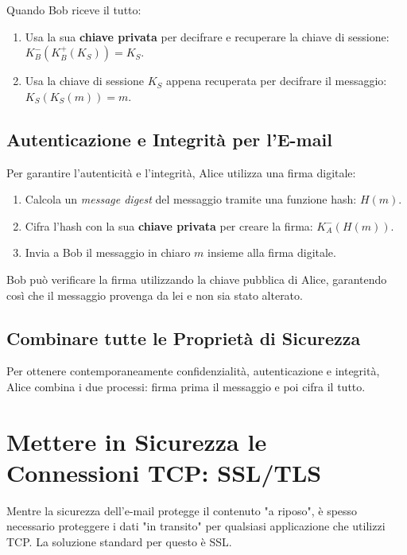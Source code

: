 Quando Bob riceve il tutto:
\begin{enumerate}
    \item Usa la sua \textbf{chiave privata} per decifrare e recuperare la chiave di sessione: $K_B^-(K_B^+(K_S)) = K_S$.
    \item Usa la chiave di sessione $K_S$ appena recuperata per decifrare il messaggio: $K_S(K_S(m)) = m$.
\end{enumerate}

\subsection{Autenticazione e Integrità per l'E-mail}
Per garantire l'autenticità e l'integrità, Alice utilizza una firma digitale:
\begin{enumerate}
    \item Calcola un \textit{message digest} del messaggio tramite una funzione hash: $H(m)$.
    \item Cifra l'hash con la sua \textbf{chiave privata} per creare la firma: $K_A^-(H(m))$.
    \item Invia a Bob il messaggio in chiaro $m$ insieme alla firma digitale.
\end{enumerate}

Bob può verificare la firma utilizzando la chiave pubblica di Alice, garantendo così che il messaggio provenga da lei e non sia stato alterato.

\subsection{Combinare tutte le Proprietà di Sicurezza}
Per ottenere contemporaneamente confidenzialità, autenticazione e integrità, Alice combina i due processi: firma prima il messaggio e poi cifra il tutto.


\section{Mettere in Sicurezza le Connessioni TCP: SSL/TLS}
Mentre la sicurezza dell'e-mail protegge il contenuto "a riposo", è spesso necessario proteggere i dati "in transito" per qualsiasi applicazione che utilizzi TCP. La soluzione standard per questo è SSL.

